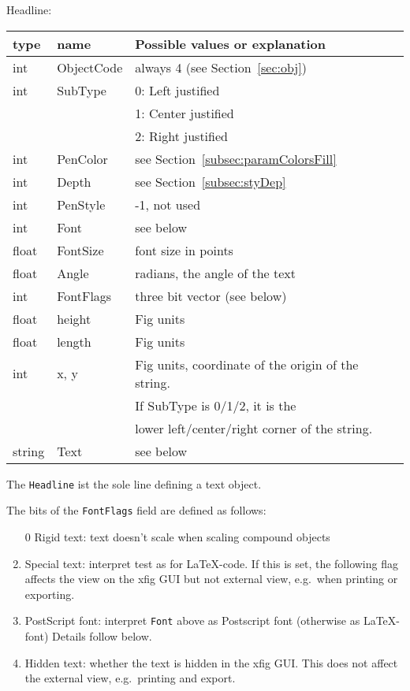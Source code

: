 \documentclass[10pt, a4paper]{article}
\begin{document}
\noindent
Headline: \\
%
\begin{tabular}{lll}
\toprule
type   & name       & Possible values or explanation \\
\midrule
\midrule
int    & ObjectCode & always 4 (see Section~\ref{sec:obj}) \\
int    & SubType    & 0: Left justified \\ %
&&                    1: Center justified \\
&&                    2: Right justified \\
int    & PenColor   & see Section~\ref{subsec:paramColorsFill} \\
int    & Depth      & see Section~\ref{subsec:styDep} \\
int    & PenStyle   & -1, not used \\
int    & Font       & see below \\
float  & FontSize   & font size in points \\
float  & Angle      & radians, the angle of the text \\
int    & FontFlags  & three bit vector (see below) \\
float  & height     & Fig units \\
float  & length     & Fig units \\
int    & x, y       & Fig units, coordinate of the origin of the string.  \\
&&                    If SubType is 0/1/2, it is the \\
&&                    lower left/center/right corner of the string.\\
string & Text       & see below \\
\bottomrule
\end{tabular}

The \texttt{Headline} ist the sole line defining a text object. 

\noindent
The bits of the \texttt{FontFlags} field are defined as follows:
%
\begin{enumerate}
\item[0]
Rigid text: text doesn't scale when scaling compound objects
\item
Special text: interpret test as for \LaTeX-code. 
If this is set, the following flag affects the view on the xfig GUI 
but not external view, e.g.~when printing or exporting. 
\item
PostScript font: interpret \texttt{Font} above 
as Postscript font (otherwise as \LaTeX{}-font) 
Details follow below. 
\item
Hidden text: whether the text is hidden in the xfig GUI\@. 
This does not affect the external view, e.g.~printing and export. 
\end{enumerate}
\end{document}

